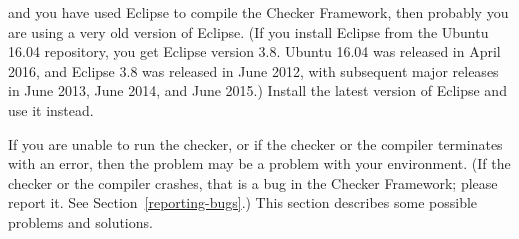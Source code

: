 \noindent
and you have used Eclipse to compile the Checker Framework, then probably
you are using a very old version of Eclipse.  (If you
install Eclipse from the Ubuntu 16.04 repository, you get Eclipse version
3.8.  Ubuntu 16.04 was released in April 2016, and Eclipse 3.8 was released
in June 2012, with subsequent major releases in June 2013, June 2014, and
June 2015.)
Install the latest version of Eclipse and use it instead.



If you are unable to run the checker, or if the checker or the compiler
terminates with an error, then the problem may be a problem with your environment.
(If the checker or the compiler crashes, that is a bug in the Checker
Framework; please report it.  See Section~\ref{reporting-bugs}.)
This section describes some possible problems and solutions.

